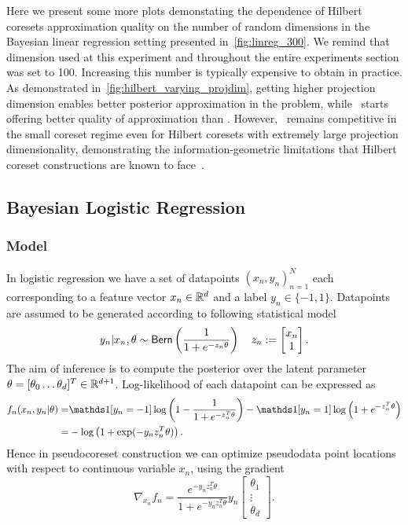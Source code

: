 Here we present some more plots demonstating the dependence of Hilbert coresets approximation quality on the number of random dimensions in the Bayesian linear regression setting presented in~\cref{fig:linreg_300}. We remind that dimension used at this experiment and throughout the entire experiments section was set to 100. Increasing this number is typically expensive to obtain in practice. As demonstrated in~\cref{fig:hilbert_varying_projdim}, getting higher projection dimension enables better posterior approximation in the problem, while \gigao~starts offering better quality of approximation than \gigar. However, \psvi~remains competitive in the small coreset regime even for Hilbert coresets with extremely large projection dimensionality, demonstrating the information-geometric limitations that Hilbert coreset constructions are known to face~\cite{campbell19neurips}.

\subsection{Bayesian Logistic Regression}
\label{supp:logreg_experiment_appendix}

\subsubsection{Model}
\label{supp:logreg_model_appendix}
In logistic regression we have a set of datapoints $(x_n, y_n)_{n=1}^{N}$ each corresponding to a feature vector ${x_n \in \mathbb{R}^d}$ and a label ${y_n \in \{-1, 1\}}$. Datapoints are assumed to be generated according to following statistical model
\[
y_n | x_n, \theta \sim {\sf{Bern}} \left( \frac{1}{1+e^{-z_n \theta}} \right) 
\quad 
z_n := \begin{bmatrix}
x_n \\
1
\end{bmatrix}.
\label{eq:logreg-model}
\]
The aim of inference is to compute the posterior over the latent parameter $ \theta = [\theta_0 \ldots \theta_d]^T \in \mathbb{R}^{d+1}$.
Log-likelihood of each datapoint can be expressed as
\[
\begin{split}
f_n(x_n, y_n|\theta)  
=&\ind{[y_n=-1]}\log \left( 1 - \frac{1}{1+e^{-z_n^T \theta}}\right) 
- \ind{[y_n=1]} \log \left( 1+ e^{-z_n^T \theta}  \right) \\
=&-\log\left( 1 + \exp(-y_n z_n^T\theta)\right).
\label{eq:logreg-loglik}
\end{split}
\]
Hence in pseudocoreset construction we can optimize pseudodata point locations with respect to continuous variable $ x_n$, using the gradient
\[
\nabla_{x_n}f_n =  \frac{e^{-y_n z_n^T \theta}}{1+e^{-y_n z_n^T \theta}}y_n \begin{bmatrix}
\theta_1 \\
\vdots \\
\theta_d
\end{bmatrix}.
\label{eq:logreg-loglik-locgrad}
\]



